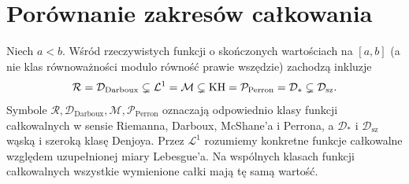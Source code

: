 \section{Porównanie zakresów całkowania}
\label{ma1:kh:sec:comparison}
\begin{twierdzenie}\label{ma1:kh:thm:integral-hierarchy}
Niech $a<b$. Wśród rzeczywistych funkcji o skończonych wartościach na $[a,b]$ (a nie klas równoważności modulo równość prawie wszędzie) zachodzą inkluzje
\[
 \mathcal R=\mathcal D_{\mathrm{Darboux}}
 \subsetneq\mathcal L^1=\mathcal M
 \subsetneq\mathrm{KH}=\mathcal P_{\mathrm{Perron}}=\mathcal D_*
 \subsetneq\mathcal D_{\mathrm{sz}}.
\]
Symbole $\mathcal R,\mathcal D_{\mathrm{Darboux}},\mathcal M,
\mathcal P_{\mathrm{Perron}}$ oznaczają odpowiednio klasy
funkcji całkowalnych w sensie Riemanna, Darboux,
McShane'a i Perrona, a $\mathcal D_*$ i $\mathcal D_{\mathrm{sz}}$
wąską i szeroką klasę Denjoya.
Przez $\mathcal L^1$ rozumiemy konkretne funkcje
całkowalne względem uzupełnionej miary Lebesgue'a. Na wspólnych klasach funkcji całkowalnych wszystkie wymienione całki mają tę samą wartość.
\end{twierdzenie}
